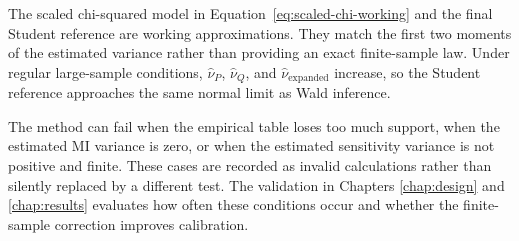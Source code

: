 The scaled chi-squared model in Equation~\eqref{eq:scaled-chi-working} and the
final Student reference are working approximations. They match the first two
moments of the estimated variance rather than providing an exact finite-sample
law. Under regular large-sample conditions,
\(\widehat\nu_P\), \(\widehat\nu_Q\), and
\(\widehat\nu_{\mathrm{expanded}}\) increase, so the Student reference
approaches the same normal limit as Wald inference.

The method can fail when the empirical table loses too much support, when the
estimated MI variance is zero, or when the estimated sensitivity variance is
not positive and finite. These cases are recorded as invalid calculations
rather than silently replaced by a different test. The validation in Chapters
\ref{chap:design} and \ref{chap:results} evaluates how often these conditions
occur and whether the finite-sample correction improves calibration.
